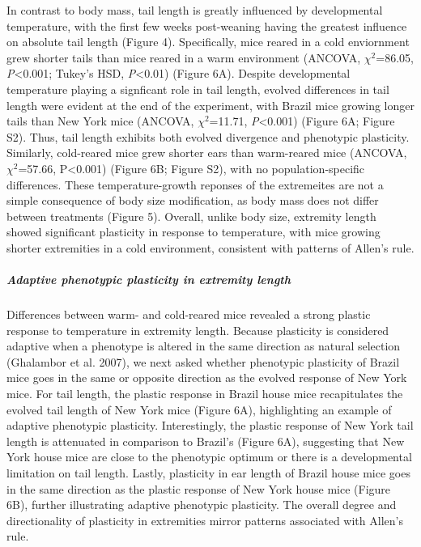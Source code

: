 \documentclass[]{article}
\let\oldsubparagraph\subparagraph
\renewcommand{\subparagraph}[1]{\oldsubparagraph{#1}\mbox{}}
\begin{document}
In contrast to body mass, tail length is greatly influenced by
developmental temperature, with the first few weeks post-weaning having
the greatest influence on absolute tail length (Figure 4). Specifically,
mice reared in a cold enviornment grew shorter tails than mice reared in
a warm environment (ANCOVA, \(\chi^2\)=86.05, \emph{P}\textless{}0.001;
Tukey's HSD, \emph{P}\textless{}0.01) (Figure 6A). Despite developmental
temperature playing a signficant role in tail length, evolved
differences in tail length were evident at the end of the experiment,
with Brazil mice growing longer tails than New York mice (ANCOVA,
\(\chi^2\)=11.71, \emph{P}\textless{}0.001) (Figure 6A; Figure S2).
Thus, tail length exhibits both evolved divergence and phenotypic
plasticity. Similarly, cold-reared mice grew shorter ears than
warm-reared mice (ANCOVA, \(\chi^2\)=57.66, P\textless{}0.001) (Figure
6B; Figure S2), with no population-specific differences. These
temperature-growth reponses of the extremeites are not a simple
consequence of body size modification, as body mass does not differ
between treatments (Figure 5). Overall, unlike body size, extremity
length showed significant plasticity in response to temperature, with
mice growing shorter extremities in a cold environment, consistent with
patterns of Allen's rule.

\vspace{2.5mm}

\hypertarget{adaptive-phenotypic-plasticity-in-extremity-length}{%
\subparagraph{\texorpdfstring{\emph{Adaptive phenotypic plasticity in
extremity
length}}{Adaptive phenotypic plasticity in extremity length}}\label{adaptive-phenotypic-plasticity-in-extremity-length}}

Differences between warm- and cold-reared mice revealed a strong plastic
response to temperature in extremity length. Because plasticity is
considered adaptive when a phenotype is altered in the same direction as
natural selection (Ghalambor et al. 2007), we next asked whether
phenotypic plasticity of Brazil mice goes in the same or opposite
direction as the evolved response of New York mice. For tail length, the
plastic response in Brazil house mice recapitulates the evolved tail
length of New York mice (Figure 6A), highlighting an example of adaptive
phenotypic plasticity. Interestingly, the plastic response of New York
tail length is attenuated in comparison to Brazil's (Figure 6A),
suggesting that New York house mice are close to the phenotypic optimum
or there is a developmental limitation on tail length. Lastly,
plasticity in ear length of Brazil house mice goes in the same direction
as the plastic response of New York house mice (Figure 6B), further
illustrating adaptive phenotypic plasticity. The overall degree and
directionality of plasticity in extremities mirror patterns associated
with Allen's rule.
\end{document}
